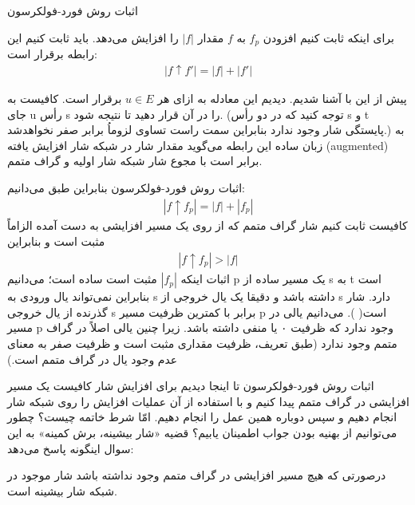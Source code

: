 \begin{itemframe}{اثبات روش فورد-فولکرسون}

\itm
برای اینکه ثابت کنیم افزودن
$f_p$
به
$f$
مقدار
$|f|$
را افزایش می‌دهد. باید ثابت کنیم این رابطه برقرار است:
\begin{align}
|f \uparrow f'|=|f| + |f'|
\label{aug-flow-sum}
\end{align}
\itm

پیش از این با
آشنا شدیم. دیدیم این معادله به ازای هر
$u \in E$
برقرار است. کافیست به جای u رأس s را در آن قرار دهید تا
نتیجه شود. (توجه کنید که در دو رأس s و t پایستگی شار وجود ندارد بنابراین سمت راست تساوی لزوماُ برابر صفر نخواهد‌شد.)
\itm
به زبان ساده این رابطه می‌گوید مقدار شار در شبکه شار افزایش یافته (augmented) برابر است با مجوع شار شبکه شار اولیه و گراف متمم.
\end{itemframe}
\begin{itemframe}{اثبات روش فورد-فولکرسون}
\itm
بنابراین طبق
می‌دانیم:
\begin{align*}
|f \uparrow f_p| = |f| + |f_p|
\end{align*}
\itm
کافیست ثابت کنیم شار گراف متمم که از روی یک مسیر افزایشی به دست آمده الزاماً مثبت است و بنابراین
\begin{align*}
|f \uparrow f_p| > |f|
\end{align*}
\itm
اثبات اینکه
$|f_p|$
مثبت است ساده است؛ می‌دانیم p یک مسیر ساده از s به t است بنابراین نمی‌تواند یال ورودی به s داشته باشد و دقیقا یک یال خروجی از s دارد.
\itm
شار گذرنده از یال خروجی s برابر با کمترین ظرفیت مسیر p است(
).  می‌دانیم یالی در مسیر p وجود ندارد که ظرفیت ۰ یا منفی داشته باشد. زیرا چنین یالی اصلاً در گراف متمم وجود ندارد (طبق تعریف، ظرفیت مقداری مثبت است و ظرفیت صفر به معنای عدم وجود یال در گراف متمم است.)
\end{itemframe}

\begin{itemframe}{اثبات روش فورد-فولکرسون}
\itm
تا اینجا دیدیم برای افزایش شار کافیست یک مسیر افزایشی در گراف متمم پیدا کنیم و با استفاده از آن عملیات افزایش را روی شبکه شار انجام دهیم و سپس دوباره همین عمل را انجام دهیم. امّا شرط خاتمه چیست؟ چطور می‌توانیم از بهنیه بودن جواب اطمینان یابیم؟
\itm
قضیه «شار بیشینه، برش کمینه»
به این سوال اینگونه پاسخ می‌دهد:

درصورتی که هیچ مسیر افزایشی در گراف متمم وجود نداشته باشد شار موجود در شبکه شار بیشینه است.
\end{itemframe}

